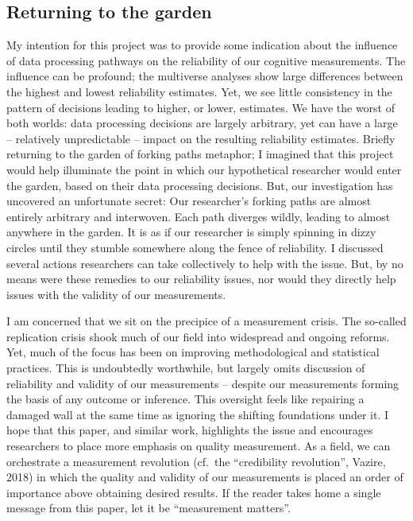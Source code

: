 \documentclass[english,man,floatsintext]{apa6}
\begin{document}
\hypertarget{returning-to-the-garden}{%
\subsection{Returning to the garden}\label{returning-to-the-garden}}

My intention for this project was to provide some indication about the influence of data processing pathways on the reliability of our cognitive measurements. The influence can be profound; the multiverse analyses show large differences between the highest and lowest reliability estimates. Yet, we see little consistency in the pattern of decisions leading to higher, or lower, estimates. We have the worst of both worlds: data processing decisions are largely arbitrary, yet can have a large -- relatively unpredictable -- impact on the resulting reliability estimates. Briefly returning to the garden of forking paths metaphor; I imagined that this project would help illuminate the point in which our hypothetical researcher would enter the garden, based on their data processing decisions. But, our investigation has uncovered an unfortunate secret: Our researcher's forking paths are almost entirely arbitrary and interwoven. Each path diverges wildly, leading to almost anywhere in the garden. It is as if our researcher is simply spinning in dizzy circles until they stumble somewhere along the fence of reliability. I discussed several actions researchers can take collectively to help with the issue. But, by no means were these remedies to our reliability issues, nor would they directly help issues with the validity of our measurements.

I am concerned that we sit on the precipice of a measurement crisis. The so-called replication crisis shook much of our field into widespread and ongoing reforms. Yet, much of the focus has been on improving methodological and statistical practices. This is undoubtedly worthwhile, but largely omits discussion of reliability and validity of our measurements -- despite our measurements forming the basis of any outcome or inference. This oversight feels like repairing a damaged wall at the same time as ignoring the shifting foundations under it. I hope that this paper, and similar work, highlights the issue and encourages researchers to place more emphasis on quality measurement. As a field, we can orchestrate a measurement revolution (cf.~the ``credibility revolution'', Vazire, 2018) in which the quality and validity of our measurements is placed an order of importance above obtaining desired results. If the reader takes home a single message from this paper, let it be \enquote{measurement matters}.
\end{document}
